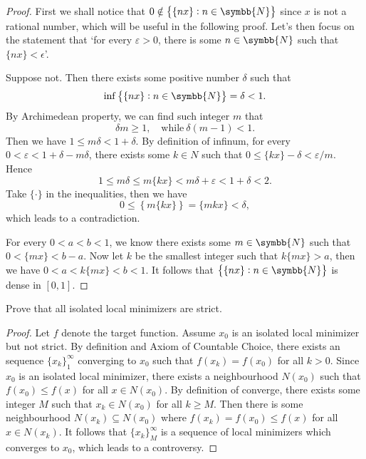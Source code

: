 \documentclass[lineno]{assignment}
\theoremstyle{plain}
\begin{document}
    \begin{proof}
        First we shall notice that $0\notin\left\{\{nx\}:n\in\symbb{N}\right\}$ since $x$ is not a rational number, which will be useful in the following proof. Let's then focus on the statement that `for every $\varepsilon>0$, there is some $n\in\symbb{N}$ such that $\{nx\}<\epsilon$'.
        
        Suppose not. Then there exists some positive number $\delta$ such that
        \begin{equation}
            \inf \left\{\{nx\}:n\in\symbb{N}\right\}=\delta<1.
        \end{equation}
        By Archimedean property, we can find such integer $m$ that
        \begin{equation}
            \delta m\geq 1,\quad\text{while}\ \delta(m-1)<1.
        \end{equation}
        Then we have $1\leq m\delta<1+\delta$. By definition of infinum, for every $0<\varepsilon<1+\delta-m\delta$, there exists some $k\in N$ such that $0\leq\{kx\}-\delta<\varepsilon/m$. Hence
        \begin{equation}
            1\leq m\delta \leq m\{kx\}<m\delta+\varepsilon<1+\delta<2.
        \end{equation}
        Take $\{\cdot\}$ in the inequalities, then we have
        \begin{equation}
            0\leq \left\{m\{kx\}\right\} = \{mkx\}<\delta,
        \end{equation}
        which leads to a contradiction.

        For every $0<a<b<1$, we know there exists some $m\in\symbb{N}$ such that $0<\{mx\}<b-a$. Now let $k$ be the smallest integer such that $k\{mx\}>a$, then we have $0<a<k\{mx\}<b<1$. It follows that $\left\{\{nx\}:n\in\symbb{N}\right\}$ is dense in $[0, 1]$.
    \end{proof}
    \begin{problem}
        Prove that all isolated local minimizers are strict.
    \end{problem}
    \begin{proof}
        Let $f$ denote the target function. Assume $x_0$ is an isolated local minimizer but not strict. By definition and Axiom of Countable Choice, there exists an sequence $\{x_k\}_1^\infty$ converging to $x_0$ such that $f(x_k)=f(x_0)$ for all $k>0$. Since $x_0$ is an isolated local minimizer, there exists a neighbourhood $N(x_0)$ such that $f(x_0)\leq f(x)$ for all $x\in N(x_0)$. By definition of converge, there exists some integer $M$ such that $x_k\in N(x_0)$ for all $k\geq M$. Then there is some neighbourhood $N(x_k)\subseteq N(x_0)$ where $f(x_k)=f(x_0)\leq f(x)$ for all $x\in N(x_k)$. It follows that $\{x_k\}_M^\infty$ is a sequence of local minimizers which converges to $x_0$, which leads to a controversy.
    \end{proof}
\end{document}
